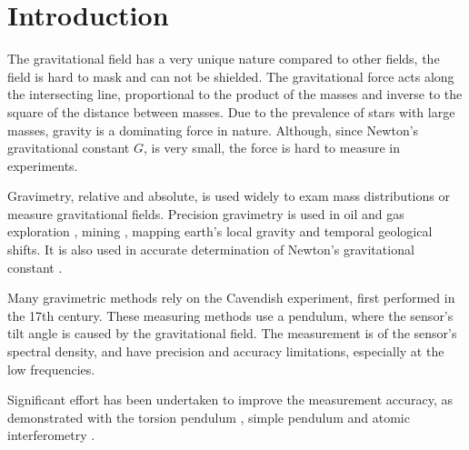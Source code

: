 \documentclass[\main/master.tex]{subfiles}
\begin{document}
\chapter{Introduction}\label{chapter:Introduction}


The gravitational field has a very unique nature compared to other fields, the field is hard to mask and can not be shielded. The gravitational force acts along the intersecting line, proportional to the product of the masses and inverse to the square of the distance between masses. Due to the prevalence of stars with large masses, gravity is a dominating force in nature. Although, since Newton's gravitational constant $G$, is very small, the force is hard to measure in experiments. 
\par\noindent
Gravimetry, relative and absolute, is used widely to exam mass distributions or measure gravitational fields. Precision gravimetry \cite{Wahr04,Bingham10,Bell98,Leeuwen00,Diorio03,Romaides01,Peters01,Luther82,Kuroda95,Karagioz96,Bagley97,Gundlach00,Quinn01,Armstrong03,Kleinevoss99,Parks10,Peters99,Mcguirk02,Dimopoulos07,Lamporesi08,Sorrentino10,Rosi14,Goodkind99} is used in oil and gas exploration \cite{Bell98}, mining \cite{Leeuwen00}, mapping earth's local gravity \cite{Wahr04,Bingham10} and temporal geological shifts. It is also used in accurate determination of Newton's gravitational constant \cite{Luther82, Kuroda95, Karagioz96, Bagley97, Gundlach00, Quinn01, Armstrong03, Kleinevoss99, Parks10, Peters99, Mcguirk02, Dimopoulos07, Lamporesi08, Sorrentino10, Rosi14}. 
\par\noindent
Many gravimetric methods rely on the Cavendish experiment, first performed in the 17th century. These measuring methods use a pendulum, where the sensor's tilt angle is caused by the gravitational field. The measurement is of the sensor's spectral density, and
have precision and accuracy limitations, especially at the low frequencies. 
\par\noindent
Significant effort has been undertaken to improve the measurement accuracy, as demonstrated with the torsion pendulum \cite{Luther82,Kuroda95,Karagioz96,Bagley97,Gundlach00,Quinn01,Armstrong03}, simple pendulum \cite {Kleinevoss99,Parks10} and atomic interferometry \cite{Lamporesi08,Sorrentino10,Rosi14}.
\iffalse
\end{document}
